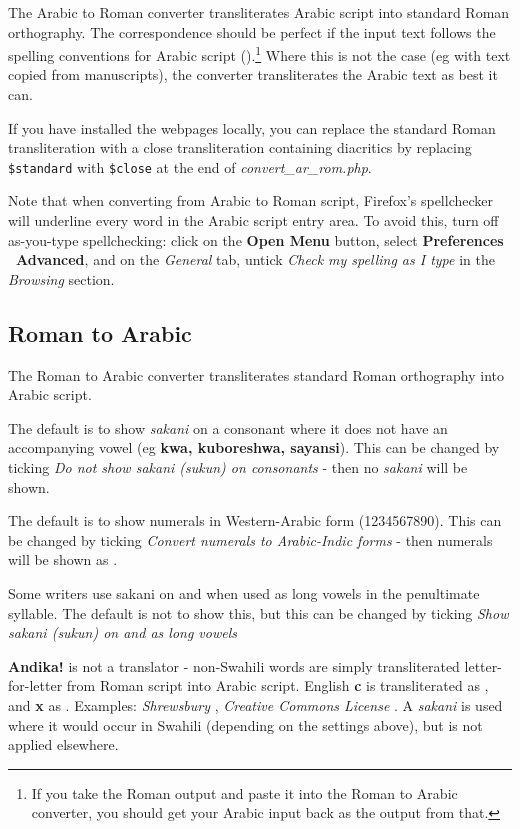The Arabic to Roman converter transliterates Arabic script into standard Roman orthography.  The correspondence should be perfect if the input text follows the spelling conventions for Arabic script ().\footnote{If you take the Roman output and paste it into the Roman to Arabic converter, you should get your Arabic input back as the output from that.}  Where this is not the case (eg with text copied from manuscripts), the converter transliterates the Arabic text as best it can.

If you have installed the webpages locally, you can replace the standard Roman transliteration with a close transliteration containing diacritics by replacing \verb|$standard| with \verb|$close| at the end of \textit{convert\_ar\_rom.php}.

Note that when converting from Arabic to Roman script, Firefox's spellchecker will underline every word in the Arabic script entry area. To avoid this, turn off as-you-type spellchecking: click on the \textbf{Open Menu} button, select \textbf{Preferences \textrightarrow\ Advanced}, and on the \textit{General} tab, untick \textit{Check my spelling as I type} in the \textit{Browsing} section.

\subsection{Roman to Arabic}

The Roman to Arabic converter transliterates standard Roman orthography into Arabic script. 

The default is to show \textit{sakani} on a consonant where it does not have an accompanying vowel (eg \textbf{kwa, kuboreshwa, sayansi}). This can be changed by ticking \textit{Do not show sakani (sukun) on consonants} - then no \textit{sakani} will be shown.

The default is to show numerals in Western-Arabic form (1234567890). This can be changed by ticking \textit{Convert numerals to Arabic-Indic forms} - then numerals will be shown as .

Some writers use sakani on  and  when used as long vowels in the penultimate syllable. The default is not to show this, but this can be changed by ticking \textit{Show sakani (sukun) on  and  as long vowels}

\textbf{Andika!} is not a translator - non-Swahili words are simply transliterated letter-for-letter from Roman script into Arabic script. English \textbf{c} is transliterated as , and \textbf{x} as . Examples: \textit{Shrewsbury} , \textit{Creative Commons License} . A \textit{sakani} is used where it would occur in Swahili (depending on the settings above), but is not applied elsewhere.

